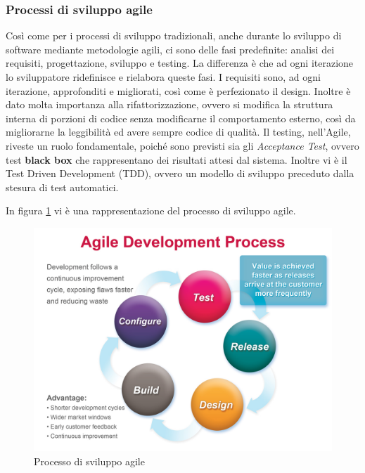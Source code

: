 \subsubsection{Processi di sviluppo agile}
Così come per i processi di sviluppo tradizionali, anche durante lo sviluppo di software mediante metodologie agili, ci sono delle fasi predefinite: analisi dei requisiti, progettazione, sviluppo e testing. La differenza è che ad ogni iterazione lo sviluppatore ridefinisce e rielabora queste fasi.
I requisiti sono, ad ogni iterazione, approfonditi e migliorati, così come è perfezionato il design. Inoltre è dato molta importanza alla rifattorizzazione, ovvero si modifica la struttura interna di porzioni di codice senza modificarne il comportamento esterno, così da migliorarne la leggibilità ed avere sempre codice di qualità.
Il testing, nell'Agile, riveste un ruolo fondamentale, poiché sono previsti sia gli \textit{Acceptance Test}, ovvero test \textbf{black box} che rappresentano dei risultati attesi dal sistema.
Inoltre vi è il Test Driven Development (TDD), ovvero un modello di sviluppo preceduto dalla stesura di test automatici.

In figura \ref{agiledevelopment} vi è una rappresentazione del processo di sviluppo agile.

\begin{figure}[h!]
\begin{center}
\includegraphics[scale=0.23]{imgs/agiledevelopment.jpg}
\caption{Processo di sviluppo agile\label{agiledevelopment}} 
\end{center}
\end{figure}

